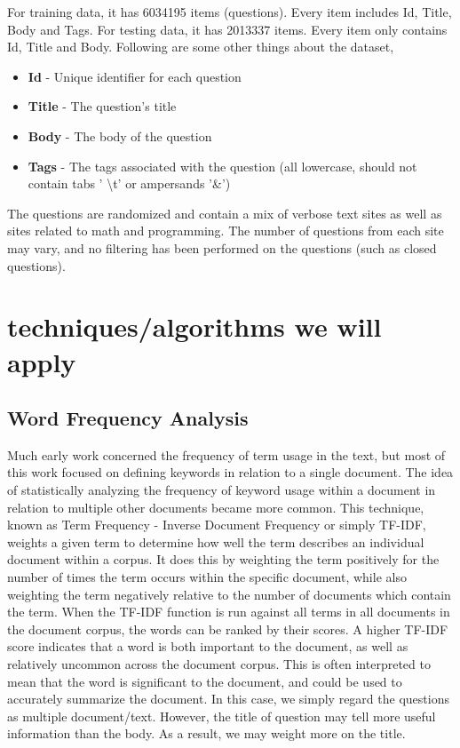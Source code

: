\documentclass[11pt]{article} %
\begin{document}
For training data, it has 6034195 items (questions). Every item includes Id, Title, Body and Tags. For testing data, it has 2013337 items. Every item only contains Id, Title and Body.
Following are some other things about the dataset,
\begin{itemize}
\item \textbf{Id} - Unique identifier for each question
\item \textbf{Title} - The question's title
\item \textbf{Body} - The body of the question
\item \textbf{Tags} - The tags associated with the question (all lowercase, should not contain tabs '
\textbackslash t' or ampersands '\&')
\end{itemize}

The questions are randomized and contain a mix of verbose text sites as well as sites related to math and programming. The number of questions from each site may vary, and no filtering has been performed on the questions (such as closed questions).


\section{techniques/algorithms we will apply}
\subsection{Word Frequency Analysis}
Much early work concerned the frequency of term usage in the text, but most of this work focused on defining keywords in relation to a single document. 
The idea of statistically analyzing the frequency of keyword usage within a document in relation to multiple other documents became more common. This technique, known as Term Frequency - Inverse Document Frequency or simply TF-IDF, weights a given term to determine how well the term describes an individual document within a corpus.
 It does this by weighting the term positively for the number of times the term occurs within the specific document, while also weighting the term negatively relative to the number of documents which contain the term. When the TF-IDF function is run against all terms in all documents in the document corpus, the words can be ranked by their scores. A higher TF-IDF score indicates that a word is both important to the document, as well as relatively uncommon across the document corpus. This is often interpreted to mean that the word is significant to the document, and could be used to accurately summarize the document. In this case, we simply regard the questions as multiple document/text. However, the title of question may tell more useful information than the body. As a result, we may weight more on the title.
\end{document}
